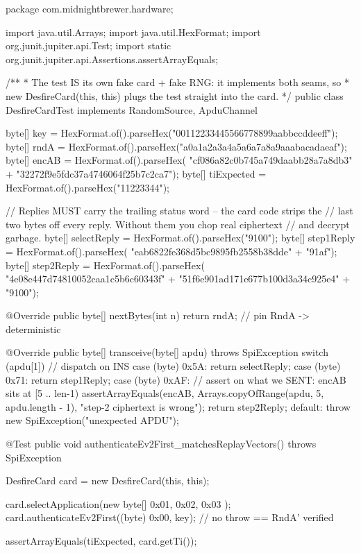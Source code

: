 \begin{jcode}
package com.midnightbrewer.hardware;

import java.util.Arrays;
import java.util.HexFormat;
import org.junit.jupiter.api.Test;
import static org.junit.jupiter.api.Assertions.assertArrayEquals;

/**
 * The test IS its own fake card + fake RNG: it implements both seams, so
 * new DesfireCard(this, this) plugs the test straight into the card.
 */
public class DesfireCardTest implements RandomSource, ApduChannel {

    byte[] key   = HexFormat.of().parseHex("00112233445566778899aabbccddeeff");
    byte[] rndA  = HexFormat.of().parseHex("a0a1a2a3a4a5a6a7a8a9aaabacadaeaf");
    byte[] encAB = HexFormat.of().parseHex(
            "cf086a82c0b745a749daabb28a7a8db3"
          + "32272f9e5fdc37a4746064f25b7c2ca7");
    byte[] tiExpected = HexFormat.of().parseHex("11223344");

    // Replies MUST carry the trailing status word -- the card code strips the
    // last two bytes off every reply. Without them you chop real ciphertext
    // and decrypt garbage.
    byte[] selectReply = HexFormat.of().parseHex("9100");
    byte[] step1Reply  = HexFormat.of().parseHex(
            "eab6822fe368d5bc9895fb2558b38dde" + "91af");
    byte[] step2Reply  = HexFormat.of().parseHex(
            "4e08e447d74810052caa1c5b6c60343f"
          + "51f6e901ad171e677b100d3a34c925e4" + "9100");

    @Override
    public byte[] nextBytes(int n) {
        return rndA;                        // pin RndA -> deterministic
    }

    @Override
    public byte[] transceive(byte[] apdu) throws SpiException {
        switch (apdu[1]) {                  // dispatch on INS
            case (byte) 0x5A:
                return selectReply;
            case (byte) 0x71:
                return step1Reply;
            case (byte) 0xAF:
                // assert on what we SENT: encAB sits at [5 .. len-1)
                assertArrayEquals(encAB,
                        Arrays.copyOfRange(apdu, 5, apdu.length - 1),
                        "step-2 ciphertext is wrong");
                return step2Reply;
            default:
                throw new SpiException("unexpected APDU");
        }
    }

    @Test
    public void authenticateEv2First_matchesReplayVectors() throws SpiException {
        DesfireCard card = new DesfireCard(this, this);

        card.selectApplication(new byte[]{ 0x01, 0x02, 0x03 });
        card.authenticateEv2First((byte) 0x00, key);  // no throw == RndA' verified

        assertArrayEquals(tiExpected, card.getTi());
    }
}
\end{jcode}

